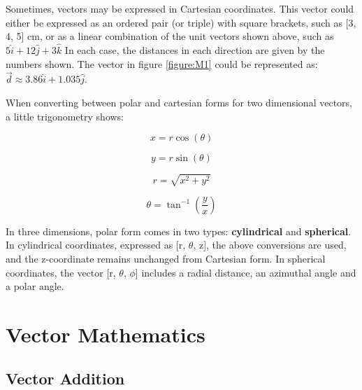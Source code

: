 	Sometimes, vectors may be expressed in Cartesian coordinates.  This vector could either be expressed as an ordered pair (or triple) with square brackets, such as [3, 4, 5] cm, or as a linear combination of the unit vectors shown above, such as $5\hat{i} + 12 \hat{j} + 3 \hat{k}$  In each case, the distances in each direction are given by the numbers shown.  The vector in figure \ref{figure:M1} could be represented as: \color{blue} $\vec{d}  \approx 3.86 \hat{i} + 1.035 \hat{j}$.  \color{black}
	
	When converting between polar and cartesian forms for two dimensional vectors, a little trigonometry shows: 
		\begin{mdframed}[backgroundcolor=orange!20!white]
	
	\color{blue}
	\begin{multicols}{2}
		\begin{center}
			\begin{equation}
			x = r \cos(\theta)
			\label{eq11}
			\end{equation}
			
			\begin{equation}
			y = r \sin(\theta)
			\end{equation}

			\begin{equation}
			r = \sqrt{x^2+y^2}			
			\end{equation}

			\begin{equation}
			\theta=\tan^{-1}(\frac{y}{x})
			\label{eq14}
			\end{equation}		
		\end{center}
	\end{multicols}
	\color{black}
	\end{mdframed}
	
	In three dimensions, polar form comes in two types: \textbf{cylindrical} and \textbf{spherical}.  In cylindrical coordinates, expressed as [r, $\theta$, z],  the above conversions are used, and the z-coordinate remains unchanged from Cartesian form.  In spherical coordinates, the vector [r, $\theta$, $\phi$] includes a radial distance, an azimuthal angle and a polar angle. 

	
	
	
	
\section{Vector Mathematics}
	\subsection{Vector Addition} 
